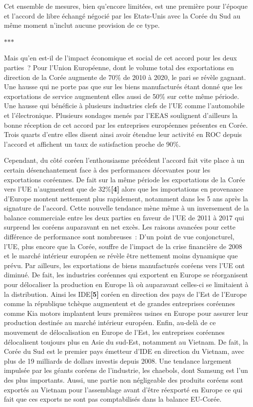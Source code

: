 \documentclass[11pt,a4paper]{article}
\newcommand{\partbreak}{\par\begin{center}\color{muted}$\ast$\quad$\ast$\quad$\ast$\end{center}\par}
\begin{document}
Cet ensemble de mesures, bien qu'encore limitées, est une première pour l'époque et l'accord de libre échangé négocié par les Etats-Unis avec la Corée du Sud au même moment n'inclut aucune provision de ce type.

\partbreak

Mais qu'en est-il de l'impact économique et social de cet accord pour les deux parties~? Pour l'Union Européenne, dont le volume total des exportations en direction de la Corée augmente de 70\% de 2010 à 2020, le pari se révèle gagnant. Une hausse qui ne porte pas que sur les biens manufacturés étant donné que les exportations de service augmentent elles aussi de 50\% sur cette même période. Une hausse qui bénéficie à plusieurs industries clefs de l'UE comme l'automobile et l'électronique. Plusieurs sondages menés par l'EEAS soulignent d'ailleurs la bonne réception de cet accord par les entreprises européennes présentes en Corée. Trois quarts d'entre elles disent ainsi avoir étendue leur activité en ROC depuis l'accord et affichent un taux de satisfaction proche de 90\%.

Cependant, du côté coréen l'enthousiasme précédent l'accord fait vite place à un certain désenchantement face à des performances décevantes pour les exportations coréennes. De fait sur la même période les exportations de la Corée vers l'UE n'augmentent que de 32\%\textbf{{[}4{]}} alors que les importations en provenance d'Europe montent nettement plus rapidement, notamment dans les 5 ans après la signature de l'accord. Cette nouvelle tendance mène même à un inversement de la balance commerciale entre les deux parties en faveur de l'UE de 2011 à 2017 qui surprend les coréens auparavant en net excès. Les raisons avancées pour cette différence de performance sont nombreuses~: D'un point de vue conjoncturel, l'UE, plus encore que la Corée, souffre de l'impact de la crise financière de 2008 et le marché intérieur européen se révèle être nettement moins dynamique que prévu. Par ailleurs, les exportations de biens manufacturés coréens vers l'UE ont diminué. De fait, les industries coréennes qui exportent en Europe se réorganisent pour délocaliser la production en Europe là où auparavant celles-ci se limitaient à la distribution. Ainsi les IDE\textbf{{[}5{]}} coréen en direction des pays de l'Est de l'Europe comme la république tchèque augmentent et de grandes entreprises coréennes comme Kia motors implantent leurs premières usines en Europe pour assurer leur production destinée au marché intérieur européen. Enfin, au-delà de ce mouvement de délocalisation en Europe de l'Est, les entreprises coréennes délocalisent toujours plus en Asie du sud-Est, notamment au Vietnam. De fait, la Corée du Sud est le premier pays émetteur d'IDE en direction du Vietnam, avec plus de 19 milliards de dollars investis depuis 2008. Une tendance largement impulsée par les géants coréens de l'industrie, les chaebols, dont Samsung est l'un des plus importants. Aussi, une partie non négligeable des produits coréens sont exportés au Vietnam pour l'assemblage avant d'être réexporté en Europe ce qui fait que ces exports ne sont pas comptabilisés dans la balance EU-Corée.
\end{document}

